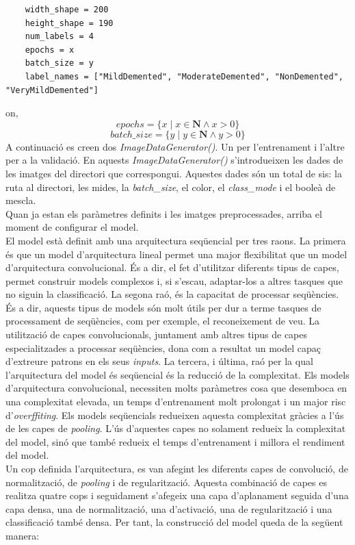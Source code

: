 \documentclass[a4paper,12pt]{report}
\begin{document}
\begin{lstlisting}
    width_shape = 200
    height_shape = 190
    num_labels = 4
    epochs = x
    batch_size = y
    label_names = ["MildDemented", "ModerateDemented", "NonDemented", "VeryMildDemented"]
\end{lstlisting}
on,
    \[epochs = \{x \mid x \in \mathbf{N} \land x > 0 \}\]
    \[batch\_size = \{y \mid y \in \mathbf{N} \land y > 0 \}\]
A continuació es creen dos \textit{ImageDataGenerator()}. Un per l'entrenament i l'altre per a la validació. En aquests \textit{ImageDataGenerator()} s'introdueixen les dades de les imatges del directori que correspongui. Aquestes dades són un total de sis: la ruta al directori, les mides, la \textit{batch\_size}, el color, el \textit{class\_mode} i el booleà de mescla.\\
Quan ja estan els paràmetres definits i les imatges preprocessades, arriba el moment de configurar el model.\\
El model està definit amb una arquitectura seqüencial per tres raons. La primera és que un model d'arquitectura lineal permet una major flexibilitat que un model d'arquitectura convolucional. És a dir, el fet d'utilitzar diferents tipus de capes, permet construir models complexos i, si s'escau, adaptar-los a altres tasques que no siguin la classificació. La segona raó, és la capacitat de processar seqüències. És a dir, aquests tipus de models són molt útils per dur a terme tasques de processament de seqüències, com per exemple, el reconeixement de veu. La utilització de capes convolucionals, juntament amb altres tipus de capes especialitzades a processar seqüències, dona com a resultat un model capaç d'extreure patrons en els seus \textit{inputs}. La tercera, i última, raó per la qual l'arquitectura del model és seqüencial és la reducció de la complexitat. Els models d'arquitectura convolucional, necessiten molts paràmetres cosa que desemboca en una complexitat elevada, un temps d'entrenament molt prolongat i un major risc d'\textit{overffiting}. Els models seqüencials redueixen aquesta complexitat gràcies a l'ús de les capes de \textit{pooling}. L'ús d'aquestes capes no solament redueix la complexitat del model, sinó que també redueix el temps d'entrenament i millora el rendiment del model.\\
Un cop definida l'arquitectura, es van afegint les diferents capes de convolució, de normalització, de \textit{pooling} i de regularització. Aquesta combinació de capes es realitza quatre cops i seguidament s'afegeix una capa d'aplanament seguida d'una capa densa, una de normalització, una d'activació, una de regularització i una classificació també densa. Per tant, la construcció del model queda de la següent manera:
\end{document}

